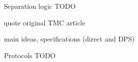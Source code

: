 \begin{frame}{Separation logic}
TODO

quote original TMC article

main ideas, specifications (direct and DPS)
\end{frame}

\begin{frame}{Protocols}
TODO
\end{frame}